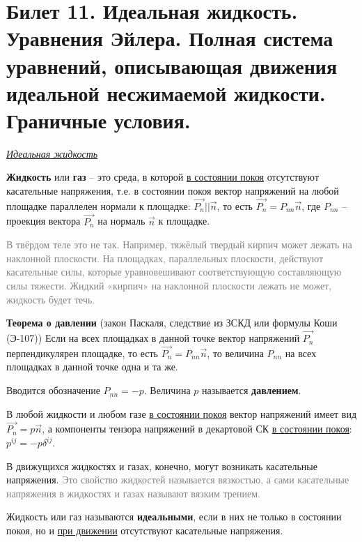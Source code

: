 \newpage
\section{Билет 11. Идеальная жидкость. Уравнения Эйлера. Полная система уравнений, описывающая движения идеальной несжимаемой жидкости. Граничные условия.}

\begin{center} \textit{\underline{Идеальная жидкость}} \end{center}

\begin{defn}[]\textbf{Жидкость} или \textbf{газ} -- это среда, в которой \underline{в состоянии покоя} отсутствуют касательные напряжения, т.е. в состоянии покоя вектор напряжений на любой площадке параллелен нормали к площадке: $ \vec{P_n} || \vec{n} $, то есть $ \vec{P_n} = P_{nn} \vec{n} $, где $ P_{nn} $ -- проекция вектора $ \vec{P_n} $ на нормаль $ \vec{n} $ к площадке.
\end{defn}

\textcolor{gray}{В твёрдом теле это не так. Например, тяжёлый твердый кирпич может лежать на наклонной плоскости. На площадках, параллельных плоскости, действуют касательные силы, которые уравновешивают соответствующую составляющую силы тяжести. Жидкий «кирпич» на наклонной плоскости лежать не может, жидкость будет течь.}

\begin{theorem}[Э-124] \textbf{Теорема о давлении} (закон Паскаля, следствие из ЗСКД или формулы Коши (Э-107))
  Если на всех площадках в данной точке вектор напряжений $ \vec{P_n} $ перпендикулярен площадке, то есть $ \vec{P_n} = P_{nn} \vec{n} $, то величина $ P_{nn} $ на всех площадках в данной точке одна и та же.
\end{theorem}

Вводится обозначение $P_{nn} = -p$. Величина $p$ называется \textbf{давлением}.

В любой жидкости и любом газе \underline{в состоянии покоя} вектор напряжений имеет вид $ \vec{P_n} = p \vec{n} $, а компоненты тензора напряжений в декартовой СК \underline{в состоянии покоя}: $ p^{ij} = -p \delta^{ij} $.

В движущихся жидкостях и газах, конечно, могут возникать касательные напряжения.
\textcolor{gray}{Это свойство жидкостей называется вязкостью, а сами касательные напряжения в жидкостях и газах называют вязким трением.}

\begin{defn}[Э-125] Жидкость или газ называются \textbf{идеальными}, если в них не только в состоянии покоя, но и \underline{при движении} отсутствуют касательные напряжения.
\end{defn}

